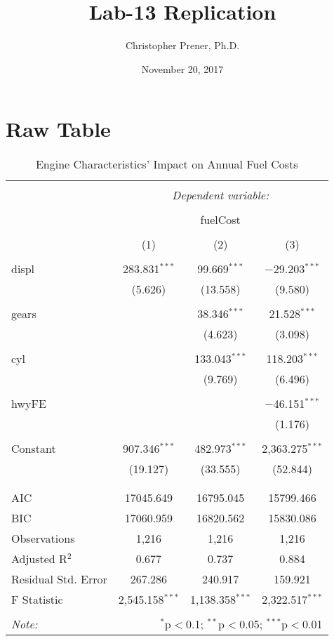 \documentclass{article}
\title{Lab-13 Replication}
\author{Christopher Prener, Ph.D.}
\date{November 20, 2017}
\begin{document}
\maketitle
\section{Raw Table}

\begin{table}[!htbp] \centering 
  \caption{Engine Characteristics' Impact on Annual Fuel Costs} 
  \label{} 
\begin{tabular}{@{\extracolsep{5pt}}lccc} 
\\[-1.8ex]\hline 
\hline \\[-1.8ex] 
 & \multicolumn{3}{c}{\textit{Dependent variable:}} \\ 
\cline{2-4} 
\\[-1.8ex] & \multicolumn{3}{c}{fuelCost} \\ 
\\[-1.8ex] & (1) & (2) & (3)\\ 
\hline \\[-1.8ex] 
 displ & 283.831$^{***}$ & 99.669$^{***}$ & $-$29.203$^{***}$ \\ 
  & (5.626) & (13.558) & (9.580) \\ 
  & & & \\ 
 gears &  & 38.346$^{***}$ & 21.528$^{***}$ \\ 
  &  & (4.623) & (3.098) \\ 
  & & & \\ 
 cyl &  & 133.043$^{***}$ & 118.203$^{***}$ \\ 
  &  & (9.769) & (6.496) \\ 
  & & & \\ 
 hwyFE &  &  & $-$46.151$^{***}$ \\ 
  &  &  & (1.176) \\ 
  & & & \\ 
 Constant & 907.346$^{***}$ & 482.973$^{***}$ & 2,363.275$^{***}$ \\ 
  & (19.127) & (33.555) & (52.844) \\ 
  & & & \\ 
\hline \\[-1.8ex] 
AIC & 17045.649 & 16795.045 & 15799.466 \\ 
BIC & 17060.959 & 16820.562 & 15830.086 \\ 
Observations & 1,216 & 1,216 & 1,216 \\ 
Adjusted R$^{2}$ & 0.677 & 0.737 & 0.884 \\ 
Residual Std. Error & 267.286 & 240.917 & 159.921 \\ 
F Statistic & 2,545.158$^{***}$ & 1,138.358$^{***}$ & 2,322.517$^{***}$ \\ 
\hline 
\hline \\[-1.8ex] 
\textit{Note:}  & \multicolumn{3}{r}{$^{*}$p$<$0.1; $^{**}$p$<$0.05; $^{***}$p$<$0.01} \\ 
\end{tabular} 
\end{table} 
\end{document}

